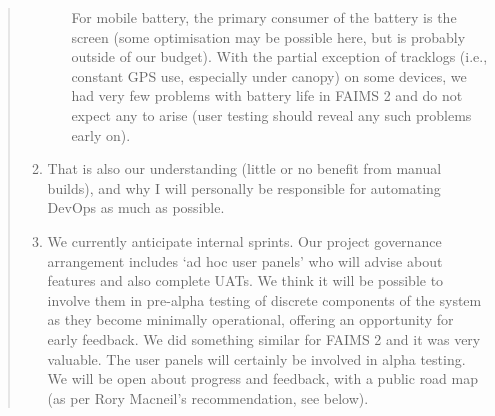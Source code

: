 \documentclass{faims3_report}
\begin{document}
\begin{quote}
\begin{enumerate}[itemsep=1em]
\begin{enumerate}
    For mobile battery, the primary consumer of the battery 
    is the screen (some optimisation may be possible here, but is probably outside
    of our budget). With the partial exception of tracklogs (i.e., constant GPS use, 
    especially under canopy) on some devices, we had very few problems with battery 
    life in FAIMS 2 and do not expect any to arise (user testing should reveal any such
    problems early on). 
   
  \end{enumerate}
\item That is also our understanding (little or no benefit from manual builds), 
   and why I will personally be responsible for automating DevOps as much as possible.
 
\item We currently anticipate internal sprints. Our project governance arrangement
   includes `ad hoc user panels' who will advise about features and also complete UATs.
   We think it will be possible to involve them in pre-alpha testing of discrete 
   components of the system as they become minimally operational, offering an
   opportunity for early feedback. We did something similar for FAIMS 2 and it was
   very valuable. The user panels will certainly be involved in alpha testing.
   We will be open about progress and feedback, with a public road map (as per Rory 
   Macneil's recommendation, see below). 
 

\end{enumerate}
\end{quote}
\end{document}
